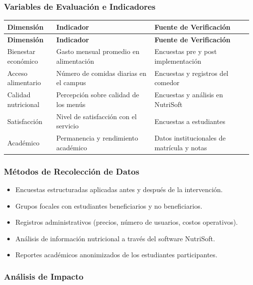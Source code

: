 \documentclass[letterpaper, 11pt]{report}
\begin{document}
\subsubsection{Variables de Evaluación e Indicadores}
\begin{longtable}{|p{0.2\linewidth}|p{0.4\linewidth}|p{0.4\linewidth}|}
\hline
\textbf{Dimensión} & \textbf{Indicador} & \textbf{Fuente de Verificación} \\
\hline
\endfirsthead

\hline
\textbf{Dimensión} & \textbf{Indicador} & \textbf{Fuente de Verificación} \\
\hline
\endhead

\hline
\endfoot

\hline
\endlastfoot

Bienestar económico & Gasto mensual promedio en alimentación & Encuestas pre y post implementación \\
\hline
Acceso alimentario & Número de comidas diarias en el campus & Encuestas y registros del comedor \\
\hline
Calidad nutricional & Percepción sobre calidad de los menús & Encuestas y análisis en NutriSoft \\
\hline
Satisfacción & Nivel de satisfacción con el servicio & Encuestas a estudiantes \\
\hline
Académico & Permanencia y rendimiento académico & Datos institucionales de matrícula y notas \\
\hline
\end{longtable}

\subsubsection{Métodos de Recolección de Datos}
\begin{itemize}
      \item Encuestas estructuradas aplicadas antes y después de la intervención.
      \item Grupos focales con estudiantes beneficiarios y no beneficiarios.
      \item Registros administrativos (precios, número de usuarios, costos operativos).
      \item Análisis de información nutricional a través del software NutriSoft.
      \item Reportes académicos anonimizados de los estudiantes participantes.
\end{itemize}

\subsubsection{Análisis de Impacto}
\end{document}
